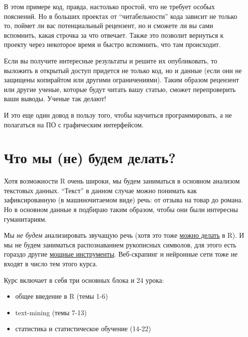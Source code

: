 \documentclass[
]{book}
\providecommand{\tightlist}{%
  \setlength{\itemsep}{0pt}\setlength{\parskip}{0pt}}
\theoremstyle{definition}
\theoremstyle{definition}
\theoremstyle{definition}
\theoremstyle{definition}
\theoremstyle{remark}
\begin{document}
В этом примере код, правда, настолько простой, что не требует особых пояснений. Но в больших проектах от ``читабельности'' кода зависит не только то, поймет ли вас потенциальный рецензент, но и сможете ли вы сами вспомнить, какая строчка за что отвечает. Также это позволит вернуться к проекту через некоторое время и быстро вспомнить, что там происходит.

Если вы получите интересные результаты и решите их опубликовать, то выложить в открытый доступ придется не только код, но и данные (если они не защищены копирайтом или другими ограничениями). Таким образом рецензент или другие ученые, которые будут читать вашу статью, сможет перепроверить ваши выводы. Ученые так делают!

И это еще один довод в пользу того, чтобы научиться программировать, а не полагаться на ПО с графическим интерфейсом.

\hypertarget{ux447ux442ux43e-ux43cux44b-ux43dux435-ux431ux443ux434ux435ux43c-ux434ux435ux43bux430ux442ux44c}{%
\section{Что мы (не) будем делать?}\label{ux447ux442ux43e-ux43cux44b-ux43dux435-ux431ux443ux434ux435ux43c-ux434ux435ux43bux430ux442ux44c}}

Хотя возможности R очень широки, мы будем заниматься в основном анализом текстовых данных. ``Текст'' в данном случае можно понимать как зафиксированную (в машиночитаемом виде) речь: от отзыва на товар до романа. Но в основном данные я подбираю таким образом, чтобы они были интересны гуманитариям.

Мы \emph{не будем} анализировать звучащую речь (хотя это тоже \href{https://ling.hse.ru/news/671710245.html}{можно делать} в R). И мы не будем заниматься распознаванием рукописных символов, для этого есть гораздо другие \href{https://vk.com/video-211800158_456239315}{мощные инструменты}. Веб-скрапинг и нейронные сети тоже не входят в число тем этого курса.

Курс включает в себя три основных блока и 24 урока:

\begin{itemize}
\tightlist
\item
  общее введение в R (темы 1-6)
\item
  text-mining (темы 7-13)
\item
  статистика и статистическое обучение (14-22)
\end{itemize}
\end{document}
